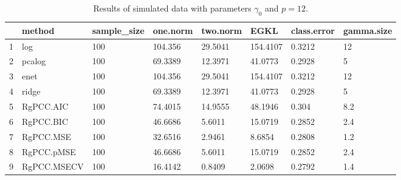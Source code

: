 \begin{table}[ht]
\centering
\begin{tabular}{rlllllll}
  \hline
 & method & sample\_size & one.norm & two.norm & EGKL & class.error & gamma.size \\ 
  \hline
1 & log & 100 & 104.356 & 29.5041 & 154.4107 & 0.3212 & 12 \\ 
  2 & pcalog & 100 & 69.3389 & 12.3971 & 41.0773 & 0.2928 & 5 \\ 
  3 & enet & 100 & 104.356 & 29.5041 & 154.4107 & 0.3212 & 12 \\ 
  4 & ridge & 100 & 69.3389 & 12.3971 & 41.0773 & 0.2928 & 5 \\ 
  5 & RgPCC.AIC & 100 & 74.4015 & 14.9555 & 48.1946 & 0.304 & 8.2 \\ 
  6 & RgPCC.BIC & 100 & 46.6686 & 5.6011 & 15.0719 & 0.2852 & 2.4 \\ 
  7 & RgPCC.MSE & 100 & 32.6516 & 2.9461 & 8.6854 & 0.2808 & 1.2 \\ 
  8 & RgPCC.pMSE & 100 & 46.6686 & 5.6011 & 15.0719 & 0.2852 & 2.4 \\ 
  9 & RgPCC.MSECV & 100 & 16.4142 & 0.8409 & 2.0698 & 0.2792 & 1.4 \\ 
   \hline
\end{tabular}
\caption{Results of simulated data with parameters $\gamma_0$ and $p =12$. } 
\label{fig-0-debug-new-algo-12-metrics-p}
\end{table}
